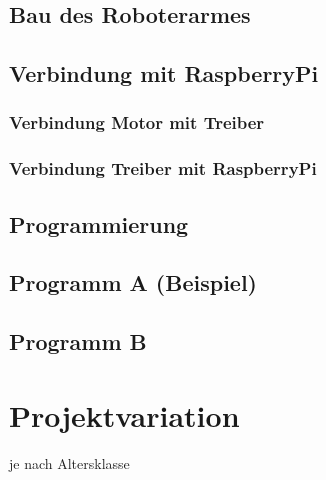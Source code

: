 \documentclass[12pt]{article}
\begin{document}
\subsection{Bau des Roboterarmes}

\subsection{Verbindung mit RaspberryPi}

\subsubsection{Verbindung Motor mit Treiber}
\subsubsection{Verbindung Treiber mit RaspberryPi}

\subsection{Programmierung}
\subsection{Programm A (Beispiel)}
\subsection{Programm B}


\section{Projektvariation}
je nach Altersklasse
\end{document}
